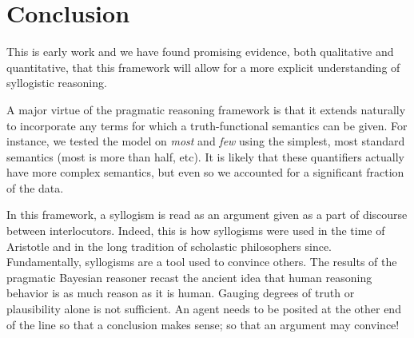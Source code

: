 \documentclass[10pt,letterpaper]{article}
\begin{document}
\section{Conclusion}

This is early work and we have found promising evidence, both qualitative and quantitative, that this framework will allow for a more explicit understanding of syllogistic reasoning. 


A major virtue of the pragmatic reasoning framework is that it extends naturally to incorporate any terms for which a truth-functional semantics can be given.
For instance, we tested the model on \emph{most} and \emph{few} using the simplest, most standard semantics (most is more than half, etc). It is likely that these quantifiers actually have more complex semantics, but even so we accounted for a significant fraction of the data.

In this framework, a syllogism is read as an argument given as a part of discourse between interlocutors. Indeed, this is how syllogisms were used in the time of Aristotle and in the long tradition of scholastic philosophers since. Fundamentally, syllogisms are a tool used to convince others. The results of the pragmatic Bayesian reasoner recast the ancient idea that human reasoning behavior is as much reason as it is human. Gauging degrees of truth or plausibility alone is not sufficient. An agent needs to be posited at the other end of the line so that a conclusion makes sense; so that an argument may convince!



\setlength{\bibleftmargin}{.125in}
\setlength{\bibindent}{-\bibleftmargin}


\end{document}
